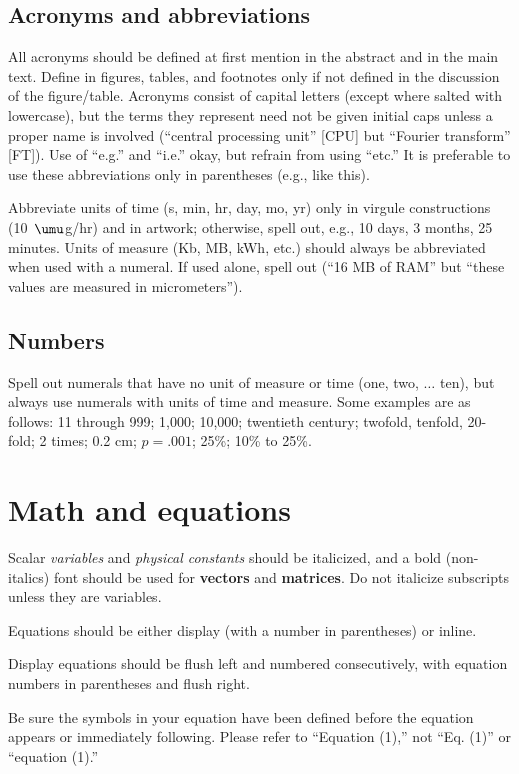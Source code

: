 \documentclass[]{IEEEibm}
\begin{document}
\subsection{Acronyms and abbreviations}

All acronyms should be defined at first mention in the abstract and in the main text. Define in figures, tables, and footnotes only if not defined in the discussion of the figure/table. Acronyms consist of capital letters (except where salted with lowercase), but the terms they represent need not be given initial caps unless a proper name is involved (``central processing unit'' [CPU] but ``Fourier transform'' [FT]). Use of ``e.g.'' and ``i.e.'' okay, but refrain from using ``etc.'' It is preferable to use these abbreviations only in parentheses (e.g., like this).

Abbreviate units of time (s, min, hr, day, mo, yr) only in virgule constructions (10~$\umu$g/hr) and in artwork; otherwise, spell out, e.g., 10 days, 3 months, 25 minutes. Units of measure (Kb, MB, kWh, etc.) should always be abbreviated when used with a numeral. If used alone, spell out (``16 MB of RAM'' but ``these values are measured in micrometers'').

\subsection{Numbers}

Spell out numerals that have no unit of measure or time (one, two, $\ldots$ ten), but always use numerals with units of time and measure. Some examples are as follows: 11 through 999; 1,000; 10,000; twentieth century; twofold, tenfold, 20-fold; 2 times; 0.2 cm; $p = .001$; 25\%; 10\% to 25\%.\pagebreak

\section{Math and equations}

Scalar {\it variables} and {\it physical constants} should be italicized, and a bold (non-italics) font should be used for {\bf vectors} and {\bf matrices}. Do not italicize subscripts unless they are variables.

Equations should be either display (with a number in parentheses) or inline.   


Display equations should be flush left and numbered consecutively, with equation numbers in parentheses and flush right.

Be sure the symbols in your equation have been defined before the equation appears or immediately following. Please refer to ``Equation (1),'' not ``Eq. (1)'' or ``equation (1).''
\end{document}
